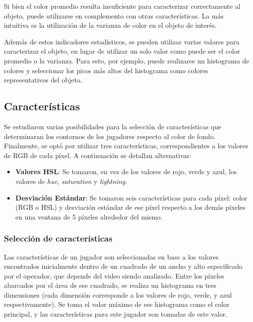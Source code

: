 Si bien el color promedio resulta insuficiente para caracterizar correctamente
al objeto, puede utilizarse en complemento con otras características. La más
intuitiva es la utilización de la varianza de color en el objeto de interés.

Además de estos indicadores estadísticos, se pueden utilizar varias valores
para caracterizar el objeto, en lugar de utilizar un solo valor como puede ser
el color promedio o la varianza. Para esto, por ejemplo, puede realizarse un
histograma de colores y seleccionar los picos más altos del histograma como
colores representativos del objeto.

\subsection{Características}

Se estudiaron varias posibilidades para la selección de características que
determinaran los contornos de los jugadores respecto al color de fondo.
Finalmente, se optó por utilizar tres características, correspondientes a los
valores de RGB de cada píxel. A continuación se detallan alternativas:
\begin{itemize}
  \item \textbf{Valores HSL}: Se tomaron, en vez de los valores de rojo, verde
    y azul, los valores de \textit{hue}, \textit{saturation} y
    \textit{lightning}.

  \item \textbf{Desviación Estándar}: Se tomaron seis características para cada
    píxel: color (RGB o HSL) y desviación estándar de ese píxel respecto a los
    demás píxeles en una ventana de 5 píxeles alrededor del mismo.

\end{itemize}

\subsubsection{Selección de características}

Las características de un jugador son seleccionadas en base a los valores
encontrados inicialmente dentro de un cuadrado de un ancho y alto especificado
por el operador, que depende del video siendo analizado. Entre los píxeles
abarcados por el área de ese cuadrado, se realiza un histograma en tres
dimensiones (cada dimensión corresponde a los valores de rojo, verde, y azul
respectivamente). Se toma el valor máximo de ese histograma como el color
principal, y las características para este jugador son tomadas de este valor.

